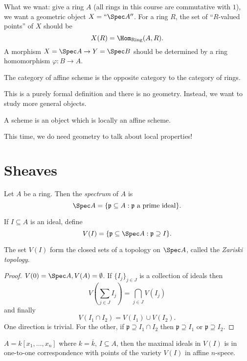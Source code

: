 \documentclass[a4paper]{article}
\begin{document}
What we wnat: give a ring \(A\) (all rings in this course are commutative with \(1\)), we want a geometric object \(X = ``\Spec A''\). For a ring \(R\), the set of ``\(R\)-valued points'' of \(X\) should be
\[
  X(R) = \Hom_{\text{Ring}}(A, R).
\]
A morphism \(X = \Spec A \to Y = \Spec B\) should be determined by a ring homomorphism \(\varphi: B \to A\).

\begin{definition}
  The category of affine scheme is the opposite category to the category of rings.
\end{definition}
This is a purely formal definition and there is no geometry. Instead, we want to study more general objects.

\begin{definition}
  A scheme is an object which is locally an affine scheme.
\end{definition}
This time, we do need geometry to talk about local properties!

\section{Sheaves}

\begin{definition}[spectrum]
  Let \(A\) be a ring. Then the \emph{spectrum} of \(A\) is
  \[
    \Spec A = \{\mathfrak p \subseteq A: \mathfrak p \text{ a prime ideal}\}.
  \]

  If \(I \subseteq A\) is an ideal, define
  \[
    V(I) = \{\mathfrak p \subseteq \Spec A: \mathfrak p \supseteq I\}.
  \]
\end{definition}

\begin{proposition}
  The set \(V(I)\) form the closed sets of a topology on \(\Spec A\), called the \emph{Zariski topology}.
\end{proposition}

\begin{proof}
  \(V(0) = \Spec A, V(A) = \emptyset\). If \(\{I_j\}_{j \in J}\) is a collection of ideals then
  \[
    V(\sum_{j \in J} I_j) = \bigcap_{j \in J} V(I_j)
  \]
  and finally
  \[
    V(I_1 \cap I_2) = V(I_1) \cup V(I_2).
  \]
  One direction is trivial. For the other, if \(\mathfrak p \supseteq I_1 \cap I_2\) then \(\mathfrak p \supseteq I_1\) or \(\mathfrak p \supseteq I_2\).
\end{proof}

\begin{eg}
  \(A = k[x_1, \dots, x_n]\) where \(k = \overline k\), \(I \subseteq A\), then the maximal ideals in \(V(I)\) is in one-to-one correspondence with points of the variety \(V(I)\) in affine \(n\)-spece.
\end{eg}
\end{document}
